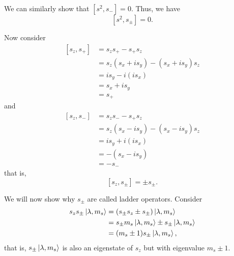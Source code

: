 We can similarly show that $[s^2, s_-] = 0$. Thus, we have
\begin{equation}\label{s2e141}
[s^2, s_\pm] = 0.
\end{equation}

Now consider
\[
\begin{aligned}
[s_z, s_+] &= s_zs_+ - s_+s_z \\
&= s_z(s_x + is_y) - (s_x + is_y)s_z \\
&= is_y -i(is_x) \\
&= s_x + is_y \\
&= s_+
\end{aligned}
\]
and
\[
\begin{aligned}
[s_z, s_-] &= s_zs_- - s_+s_z \\
&= s_z(s_x - is_y) - (s_x - is_y)s_z \\
&= is_y + i(is_x) \\
&= -(s_x - is_y) \\
&= -s_-
\end{aligned}
\]
that is,
\begin{equation}\label{c2e142}
[s_z, s_\pm] = \pm s_\pm.
\end{equation}

We will now show why $s_\pm$ are called ladder operators. Consider
\begin{equation}\label{c2e143}
\begin{aligned}
s_zs_\pm\ket{\lambda, m_s} &= (s_\pm s_z \pm s_\pm)\ket{\lambda, m_s} \\
&= s_\pm m_s\ket{\lambda, m_s} \pm s_\pm\ket{\lambda, m_s} \\
&= (m_s \pm 1)s_\pm\ket{\lambda, m_s},
\end{aligned}
\end{equation}
that is, $s_\pm\ket{\lambda, m_s}$ is also an eigenstate of $s_z$ but with
eigenvalue $m_s \pm 1$.

